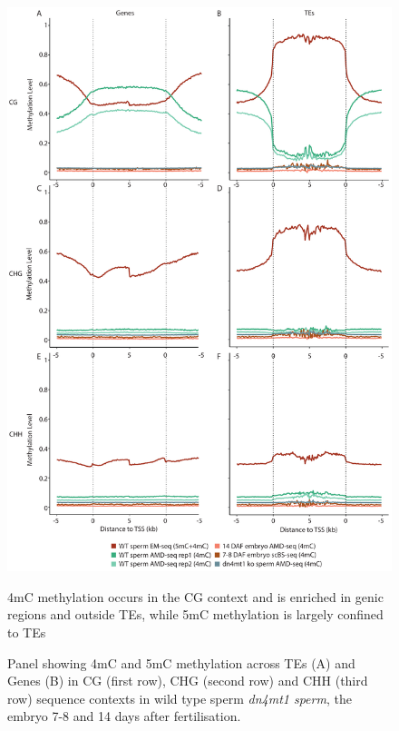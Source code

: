 \begin{figure}[htbp!] 
\centering    
    \includegraphics[width=1\textwidth]{Chapter3/Figs/Figure2_ends_analysis.pdf}
\caption{4mC methylation occurs in the CG context and is enriched in genic regions and outside TEs, while 5mC methylation is largely confined to TEs}
\label{fig:ends_analysis}
\captionsetup{font=small}
    \caption*{Panel showing 4mC and 5mC methylation across TEs (A) and Genes (B) in CG (first row), CHG (second row) and CHH (third row) sequence contexts in wild type sperm \textit{dn4mt1 sperm}, the embryo 7-8 and 14 days after fertilisation.}
\end{figure}

